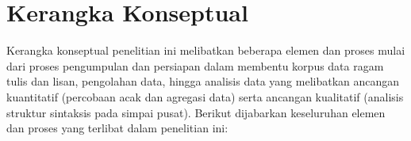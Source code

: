 

\section{Kerangka Konseptual}

Kerangka konseptual penelitian ini melibatkan beberapa elemen dan proses mulai dari proses pengumpulan dan persiapan dalam membentu korpus data ragam tulis dan lisan, pengolahan data, hingga analisis data yang melibatkan ancangan kuantitatif (percobaan acak dan agregasi data) serta ancangan kualitatif (analisis struktur sintaksis pada simpai pusat). Berikut dijabarkan keseluruhan elemen dan proses yang terlibat dalam penelitian ini:

